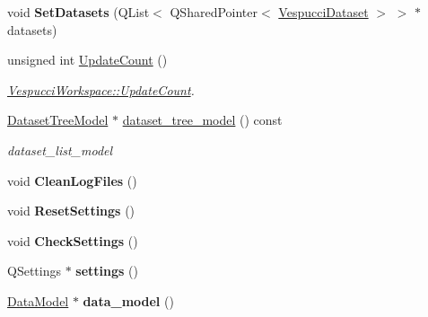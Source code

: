 \begin{DoxyCompactItemize}
\item 
void {\bfseries Set\+Datasets} (Q\+List$<$ Q\+Shared\+Pointer$<$ \hyperlink{class_vespucci_dataset}{Vespucci\+Dataset} $>$ $>$ $\ast$datasets)\hypertarget{class_vespucci_workspace_a4c61894b1e3fa46dfa1c413d6744f7a1}{}\label{class_vespucci_workspace_a4c61894b1e3fa46dfa1c413d6744f7a1}

\item 
unsigned int \hyperlink{class_vespucci_workspace_aebfe908b3f6d609aa1d9ecb3559b78cb}{Update\+Count} ()
\begin{DoxyCompactList}\small\item\em \hyperlink{class_vespucci_workspace_aebfe908b3f6d609aa1d9ecb3559b78cb}{Vespucci\+Workspace\+::\+Update\+Count}. \end{DoxyCompactList}\item 
\hyperlink{class_dataset_tree_model}{Dataset\+Tree\+Model} $\ast$ \hyperlink{class_vespucci_workspace_af5a3159a74c15af65e18eb790fc8be87}{dataset\+\_\+tree\+\_\+model} () const 
\begin{DoxyCompactList}\small\item\em dataset\+\_\+list\+\_\+model \end{DoxyCompactList}\item 
void {\bfseries Clean\+Log\+Files} ()\hypertarget{class_vespucci_workspace_ae0dbc24a1eef1ccb70461d4466104e9f}{}\label{class_vespucci_workspace_ae0dbc24a1eef1ccb70461d4466104e9f}

\item 
void {\bfseries Reset\+Settings} ()\hypertarget{class_vespucci_workspace_a8717f0d12adb75821891c072272ad131}{}\label{class_vespucci_workspace_a8717f0d12adb75821891c072272ad131}

\item 
void {\bfseries Check\+Settings} ()\hypertarget{class_vespucci_workspace_af76757ab9117ebad37b8ccf3667874e3}{}\label{class_vespucci_workspace_af76757ab9117ebad37b8ccf3667874e3}

\item 
Q\+Settings $\ast$ {\bfseries settings} ()\hypertarget{class_vespucci_workspace_ab74efdd4196dd314a5cdcd464274be32}{}\label{class_vespucci_workspace_ab74efdd4196dd314a5cdcd464274be32}

\item 
\hyperlink{class_data_model}{Data\+Model} $\ast$ {\bfseries data\+\_\+model} ()\hypertarget{class_vespucci_workspace_ab5c8a382c3f83053f95308e7b03c4e94}{}\label{class_vespucci_workspace_ab5c8a382c3f83053f95308e7b03c4e94}


\end{DoxyCompactItemize}
